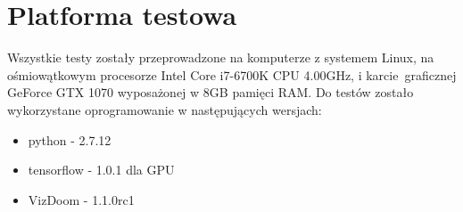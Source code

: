 \section{Platforma testowa}
Wszystkie testy zostały przeprowadzone na komputerze z systemem Linux, na ośmiowątkowym procesorze Intel Core i7-6700K CPU 4.00GHz, i karcie graficznej GeForce GTX 1070 wyposażonej w 8GB pamięci RAM.
Do testów zostało wykorzystane oprogramowanie w następujących wersjach:
\begin{itemize}
\item{python - 2.7.12}
\item{tensorflow - 1.0.1 dla GPU}
\item{VizDoom - 1.1.0rc1}
\end{itemize}
